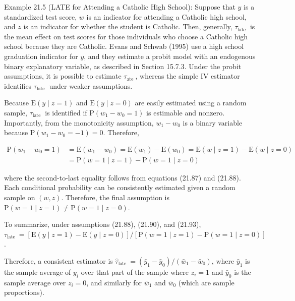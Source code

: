 \documentclass[10pt]{article}
\begin{document}
Example 21.5 (LATE for Attending a Catholic High School): Suppose that $y$ is a standardized test score, $w$ is an indicator for attending a Catholic high school, and $z$ is an indicator for whether the student is Catholic. Then, generally, $\tau_{\text {late }}$ is the mean effect on test scores for those individuals who choose a Catholic high school because they are Catholic. Evans and Schwab (1995) use a high school graduation indicator for $y$, and they estimate a probit model with an endogenous binary explanatory variable, as described in Section 15.7.3. Under the probit assumptions, it is possible to estimate $\tau_{\text {ate }}$, whereas the simple IV estimator identifies $\tau_{\text {late }}$ under weaker assumptions.

Because $\mathrm{E}(y \mid z=1)$ and $\mathrm{E}(y \mid z=0)$ are easily estimated using a random sample, $\tau_{\text {late }}$ is identified if $\mathrm{P}\left(w_{1}-w_{0}=1\right)$ is estimable and nonzero. Importantly, from the monotonicity assumption, $w_{1}-w_{0}$ is a binary variable because $\mathrm{P}\left(w_{1}-w_{0}=-1\right)=0$. Therefore,

$$
\begin{aligned}
\mathrm{P}\left(w_{1}-w_{0}=1\right) & =\mathrm{E}\left(w_{1}-w_{0}\right)=\mathrm{E}\left(w_{1}\right)-\mathrm{E}\left(w_{0}\right)=\mathrm{E}(w \mid z=1)-\mathrm{E}(w \mid z=0) \\
& =\mathrm{P}(w=1 \mid z=1)-\mathrm{P}(w=1 \mid z=0)
\end{aligned}
$$

where the second-to-last equality follows from equations (21.87) and (21.88). Each conditional probability can be consistently estimated given a random sample on $(w, z)$. Therefore, the final assumption is\\
$\mathrm{P}(w=1 \mid z=1) \neq \mathrm{P}(w=1 \mid z=0)$.

To summarize, under assumptions (21.88), (21.90), and (21.93),\\
$\tau_{\text {late }}=[\mathrm{E}(y \mid z=1)-\mathrm{E}(y \mid z=0)] /[\mathrm{P}(w=1 \mid z=1)-\mathrm{P}(w=1 \mid z=0)]$.

Therefore, a consistent estimator is $\hat{\tau}_{\text {late }}=\left(\bar{y}_{1}-\bar{y}_{0}\right) /\left(\bar{w}_{1}-\bar{w}_{0}\right)$, where $\bar{y}_{1}$ is the sample average of $y_{i}$ over that part of the sample where $z_{i}=1$ and $\bar{y}_{0}$ is the sample average over $z_{i}=0$, and similarly for $\bar{w}_{1}$ and $\bar{w}_{0}$ (which are sample proportions).
\end{document}
